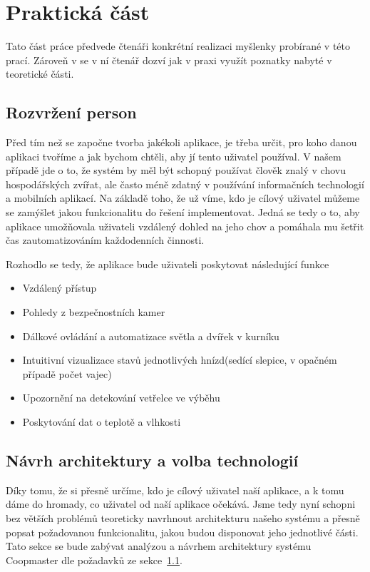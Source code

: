 


\chapter{Praktická část}\label{ch:prakticka-cast}
Tato část práce předvede čtenáři konkrétní realizaci myšlenky probírané v této prací.
Zároveň v se v ní čtenář dozví jak v praxi využít poznatky nabyté v teoretické části.


\section{Rozvržení person}\label{sec:rozvrzeni-person}
Před tím než se započne tvorba jakékoli aplikace, je třeba určit, pro koho danou aplikaci tvoříme a jak bychom chtěli, aby jí tento uživatel používal.
V našem případě jde o to, že systém by měl být schopný používat člověk znalý v chovu hospodářských zvířat, ale často méně zdatný v používání informačních technologií a mobilních aplikací.
Na základě toho, že už víme, kdo je cílový uživatel můžeme se zamýšlet jakou funkcionalitu do řešení implementovat.
Jedná se tedy o to, aby aplikace umožňovala uživateli vzdálený dohled na jeho chov a pomáhala mu šetřit čas zautomatizováním každodenních činnosti.

Rozhodlo se tedy, že aplikace bude uživateli poskytovat následující funkce
\begin{itemize}
    \item Vzdálený přístup
    \item Pohledy z bezpečnostních kamer
    \item Dálkové ovládání a automatizace světla a dvířek v kurníku
    \item Intuitivní vizualizace stavů jednotlivých hnízd(sedící slepice, v opačném případě počet vajec)
    \item Upozornění na detekování vetřelce ve výběhu
    \item Poskytování dat o teplotě a vlhkosti
\end{itemize}

\newpage
\section{Návrh architektury a volba technologií}\label{sec:navrh-architektury-a-volba-technologii}
Díky tomu, že si přesně určíme, kdo je cílový uživatel naší aplikace, a k tomu dáme do hromady, co uživatel od naší aplikace očekává.
Jsme tedy nyní schopni bez větších problémů teoreticky navrhnout architekturu našeho systému a přesně popsat požadovanou funkcionalitu, jakou budou disponovat jeho jednotlivé části.
Tato sekce se bude zabývat analýzou a návrhem architektury systému Coopmaster dle požadavků ze sekce~\ref{sec:rozvrzeni-person}.

